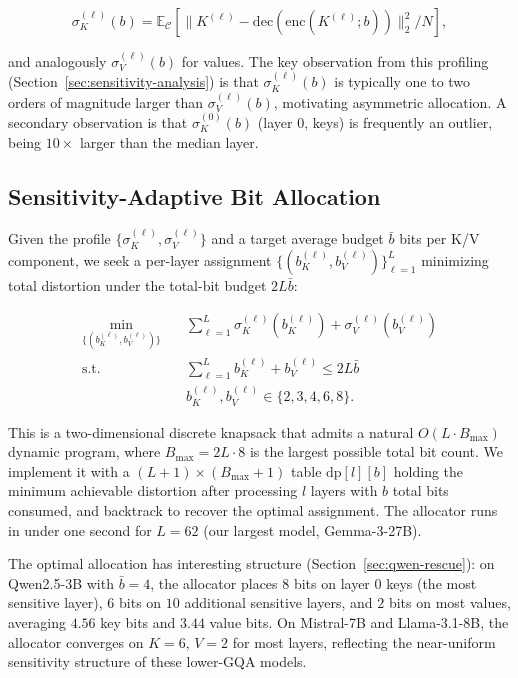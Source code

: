 \documentclass[11pt]{article}
\begin{document}
\begin{equation}
\sigma^{(\ell)}_K(b) = \mathbb{E}_\mathcal{C}\!\left[\|K^{(\ell)} - \mathrm{dec}(\mathrm{enc}(K^{(\ell)}; b))\|_2^2 / N\right],
\end{equation}

and analogously $\sigma^{(\ell)}_V(b)$ for values. The key observation from this profiling (Section~\ref{sec:sensitivity-analysis}) is that $\sigma^{(\ell)}_K(b)$ is typically one to two orders of magnitude larger than $\sigma^{(\ell)}_V(b)$, motivating asymmetric allocation. A secondary observation is that $\sigma^{(0)}_K(b)$ (layer $0$, keys) is frequently an outlier, being $10\times$ larger than the median layer.

\subsection{Sensitivity-Adaptive Bit Allocation}
\label{sec:adaptive}

Given the profile $\{\sigma^{(\ell)}_K, \sigma^{(\ell)}_V\}$ and a target average budget $\bar b$ bits per K/V component, we seek a per-layer assignment $\{(b^{(\ell)}_K, b^{(\ell)}_V)\}_{\ell=1}^L$ minimizing total distortion under the total-bit budget $2 L \bar b$:

\begin{align}
\min_{\{(b^{(\ell)}_K, b^{(\ell)}_V)\}} \quad & \sum_{\ell=1}^{L} \sigma^{(\ell)}_K(b^{(\ell)}_K) + \sigma^{(\ell)}_V(b^{(\ell)}_V) \\
\mathrm{s.t.} \quad & \sum_{\ell=1}^{L} b^{(\ell)}_K + b^{(\ell)}_V \le 2 L \bar b \\
& b^{(\ell)}_K, b^{(\ell)}_V \in \{2, 3, 4, 6, 8\}.
\end{align}

This is a two-dimensional discrete knapsack that admits a natural $O(L \cdot B_{\max})$ dynamic program, where $B_{\max} = 2 L \cdot 8$ is the largest possible total bit count. We implement it with a $(L+1) \times (B_{\max}+1)$ table $\mathrm{dp}[l][b]$ holding the minimum achievable distortion after processing $l$ layers with $b$ total bits consumed, and backtrack to recover the optimal assignment. The allocator runs in under one second for $L=62$ (our largest model, Gemma-3-27B).

The optimal allocation has interesting structure (Section~\ref{sec:qwen-rescue}): on Qwen2.5-3B with $\bar b = 4$, the allocator places $8$ bits on layer $0$ keys (the most sensitive layer), $6$ bits on $10$ additional sensitive layers, and $2$ bits on most values, averaging $4.56$ key bits and $3.44$ value bits. On Mistral-7B and Llama-3.1-8B, the allocator converges on $K{=}6$, $V{=}2$ for most layers, reflecting the near-uniform sensitivity structure of these lower-GQA models.
\end{document}

